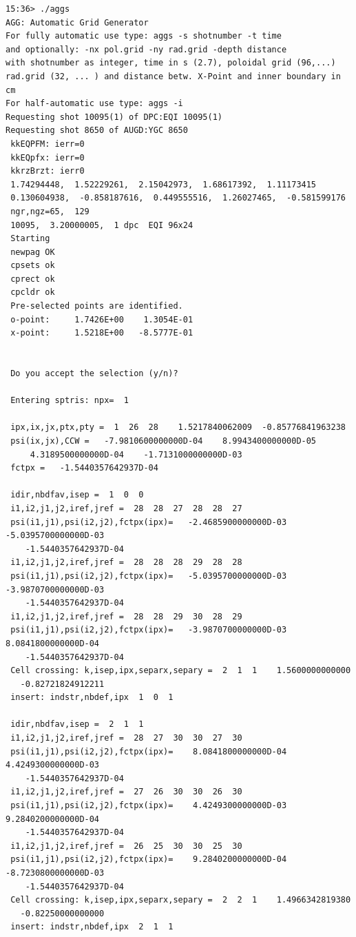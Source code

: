 \documentclass[a4paper,10pt]{report}
\begin{document}
\begin{Verbatim}[fontsize=\footnotesize]
15:36> ./aggs
AGG: Automatic Grid Generator
For fully automatic use type: aggs -s shotnumber -t time
and optionally: -nx pol.grid -ny rad.grid -depth distance
with shotnumber as integer, time in s (2.7), poloidal grid (96,...)
rad.grid (32, ... ) and distance betw. X-Point and inner boundary in cm
For half-automatic use type: aggs -i
Requesting shot 10095(1) of DPC:EQI 10095(1)
Requesting shot 8650 of AUGD:YGC 8650
 kkEQPFM: ierr=0
 kkEQpfx: ierr=0
 kkrzBrzt: ierr0
 1.74294448,  1.52229261,  2.15042973,  1.68617392,  1.11173415
 0.130604938,  -0.858187616,  0.449555516,  1.26027465,  -0.581599176
 ngr,ngz=65,  129
 10095,  3.20000005,  1 dpc  EQI 96x24
 Starting
 newpag OK
 cpsets ok
 cprect ok
 cpcldr ok
 Pre-selected points are identified.
 o-point:     1.7426E+00    1.3054E-01
 x-point:     1.5218E+00   -8.5777E-01


 Do you accept the selection (y/n)?

 Entering sptris: npx=  1

 ipx,ix,jx,ptx,pty =  1  26  28    1.5217840062009  -0.85776841963238
 psi(ix,jx),CCW =   -7.9810600000000D-04    8.9943400000000D-05
     4.3189500000000D-04    -1.7131000000000D-03
 fctpx =   -1.5440357642937D-04

 idir,nbdfav,isep =  1  0  0
 i1,i2,j1,j2,iref,jref =  28  28  27  28  28  27
 psi(i1,j1),psi(i2,j2),fctpx(ipx)=   -2.4685900000000D-03   -5.0395700000000D-03
    -1.5440357642937D-04
 i1,i2,j1,j2,iref,jref =  28  28  28  29  28  28
 psi(i1,j1),psi(i2,j2),fctpx(ipx)=   -5.0395700000000D-03   -3.9870700000000D-03
    -1.5440357642937D-04
 i1,i2,j1,j2,iref,jref =  28  28  29  30  28  29
 psi(i1,j1),psi(i2,j2),fctpx(ipx)=   -3.9870700000000D-03    8.0841800000000D-04
    -1.5440357642937D-04
 Cell crossing: k,isep,ipx,separx,separy =  2  1  1    1.5600000000000
   -0.82721824912211
 insert: indstr,nbdef,ipx  1  0  1

 idir,nbdfav,isep =  2  1  1
 i1,i2,j1,j2,iref,jref =  28  27  30  30  27  30
 psi(i1,j1),psi(i2,j2),fctpx(ipx)=    8.0841800000000D-04    4.4249300000000D-03
    -1.5440357642937D-04
 i1,i2,j1,j2,iref,jref =  27  26  30  30  26  30
 psi(i1,j1),psi(i2,j2),fctpx(ipx)=    4.4249300000000D-03    9.2840200000000D-04
    -1.5440357642937D-04
 i1,i2,j1,j2,iref,jref =  26  25  30  30  25  30
 psi(i1,j1),psi(i2,j2),fctpx(ipx)=    9.2840200000000D-04   -8.7230800000000D-03
    -1.5440357642937D-04
 Cell crossing: k,isep,ipx,separx,separy =  2  2  1    1.4966342819380
   -0.82250000000000
 insert: indstr,nbdef,ipx  2  1  1


\end{Verbatim}
\end{document}
